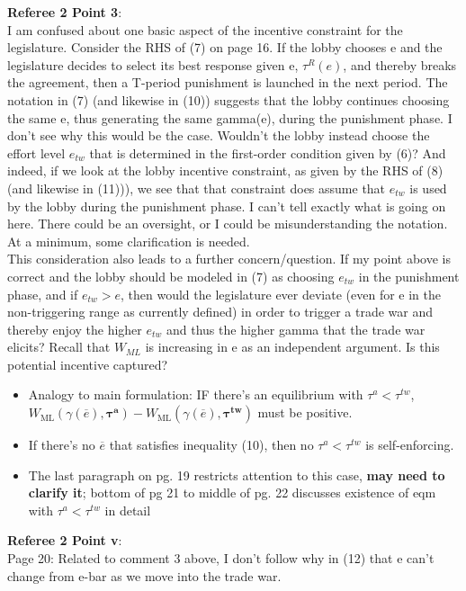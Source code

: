 \documentclass[12pt]{article}
\newcommand{\ov}{\overline}
\newcommand{\bta}{\bm{\tau^a}}
\newcommand{\btw}{\bm{\tau^{tw}}}
\newcommand{\ga}{\gamma}
\begin{document}
\textbf{Referee 2 Point 3}: \\
 I am confused about one basic aspect of the incentive constraint for the legislature. Consider the RHS of (7) on page 16. If the lobby chooses e and the legislature decides to select its best response given e, $\tau^R(e)$, and thereby breaks the agreement, then a T-period punishment is launched in the next period. The notation in (7) (and likewise in (10)) suggests that the lobby continues choosing the same e, thus generating the same gamma(e), during the punishment phase. I don't see why this would be the case. Wouldn't the lobby instead choose the effort level $e_{tw}$ that is determined in the first-order condition given by (6)? And indeed, if we look at the lobby incentive constraint, as given by the RHS of (8) (and likewise in (11))), we see that that constraint does assume that $e_{tw}$ is used by the lobby during the punishment phase. I can't tell exactly what is going on here. There could be an oversight, or I could be misunderstanding the notation. At a minimum, some clarification is needed. \\

This consideration also leads to a further concern/question. If my point above is correct and the lobby should be modeled in (7) as choosing $e_{tw}$ in the punishment phase, and if $e_{tw} > e$, then would the legislature ever deviate (even for e in the non-triggering range as currently defined) in order to trigger a trade war and thereby enjoy the higher $e_{tw}$ and thus the higher gamma that the trade war elicits? Recall that $W_{ML}$ is increasing in e as an independent argument. Is this potential incentive captured? \\

				\begin{itemize}
					\item Analogy to main formulation: IF there's an equilibrium with $\tau^a < \tau^{tw}$, $W_\text{ML}(\ga(\ov{e}),\bta) - W_\text{ML}(\ga(\ov{e}),\btw)$ must be positive.
					\item If there's no $\ov{e}$ that satisfies inequality (10), then no $\tau^a < \tau^{tw}$ is self-enforcing.
					\item The last paragraph on pg. 19 restricts attention to this case, \textbf{may need to clarify it}; bottom of pg 21 to middle of pg. 22 discusses existence of eqm with $\tau^a < \tau^{tw}$ in detail
				\end{itemize}

\textbf{Referee 2 Point v}: \\
Page 20: Related to comment 3 above, I don't follow why in (12) that e can't change from e-bar as we move into the trade war.
\end{document}
